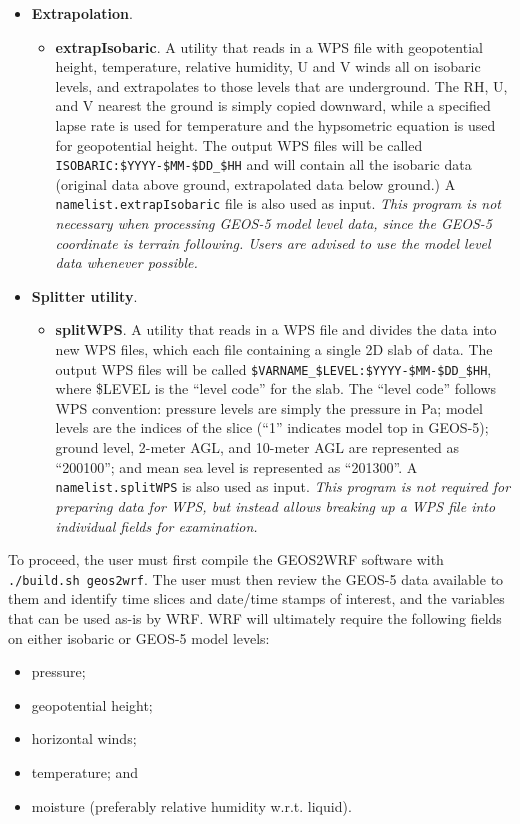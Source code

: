 \begin{itemize}
\begin{itemize}
\end{itemize}

\item \textbf{Extrapolation}. 
\begin{itemize}
\item \textbf{extrapIsobaric}.  A utility that reads in a WPS file with 
geopotential height, temperature, relative humidity, U and V winds all on 
isobaric levels, and extrapolates to those levels that are underground.  The 
RH, U, and V nearest the ground is simply copied downward, while a specified 
lapse rate is used for temperature and the hypsometric equation is used for 
geopotential height.  The output WPS files will be called 
\texttt{ISOBARIC:\$YYYY-\$MM-\$DD\_\$HH} and will contain all the isobaric 
data (original data above ground, extrapolated data below ground.)  A 
\texttt{namelist.extrapIsobaric} file is also used as input.  \emph{This 
program is not necessary when processing GEOS-5 model level data, since the 
GEOS-5 coordinate is terrain following.  Users are advised to use the model 
level data whenever possible.}
\end{itemize}

\item \textbf{Splitter utility}. 
\begin{itemize}
\item \textbf{splitWPS}. A utility that reads in a WPS file and divides the 
  data into new WPS files, which each file containing a single 2D slab of data.
  The output WPS files will be called 
  \texttt{\$VARNAME\_\$LEVEL:\$YYYY-\$MM-\$DD\_\$HH}, where \$LEVEL is 
  the ``level code'' for the slab.  The ``level code'' follows WPS convention:
  pressure levels are simply the pressure in Pa; model levels are the indices 
  of the slice (``1'' indicates model top in GEOS-5); ground level, 2-meter 
  AGL, and 10-meter AGL are represented as ``200100''; and mean sea level is 
  represented as ``201300''.  A \texttt{namelist.splitWPS} is also used as 
  input. \emph{This program is not required for preparing data for WPS, but 
  instead allows breaking up a WPS file into individual fields for 
  examination.}  
\end{itemize}

\end{itemize}

To proceed, the user must first compile the GEOS2WRF software with
\texttt{./build.sh geos2wrf}. The user must then review the GEOS-5 data 
available to them and identify time slices and date/time stamps of interest, 
and the variables that can be used as-is by WRF. WRF will ultimately require 
the following fields on either isobaric or GEOS-5 model levels:
\begin{itemize}
\item pressure;
\item geopotential height;
\item horizontal winds;
\item temperature; and
\item moisture (preferably relative humidity w.r.t. liquid).
\end{itemize}


